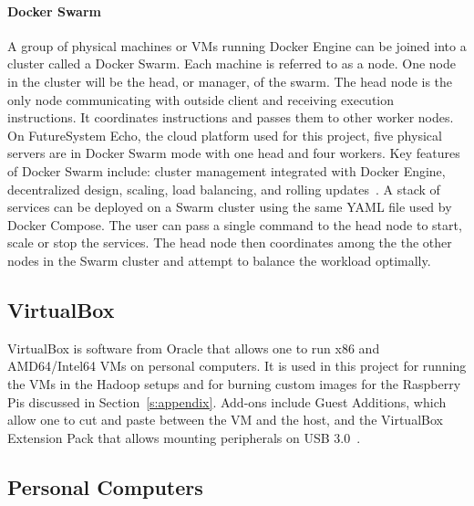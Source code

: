 \paragraph{Docker Swarm} A group of physical machines or VMs running 
Docker Engine can be joined into a cluster called a Docker Swarm. Each
machine is referred to as a node. One node in the cluster will be the
head, or manager, of the swarm. The head node is the only node
communicating with outside client and receiving execution
instructions. It coordinates instructions and passes them to other
worker nodes. On FutureSystem Echo, the cloud platform used for this
project, five physical servers are in Docker Swarm mode with one head
and four workers. Key features of Docker Swarm include: cluster
management integrated with Docker Engine, decentralized design,
scaling, load balancing, and rolling
updates~\cite{hid-sp18-405-docker-swarm-doc}. A stack of services can
be deployed on a Swarm cluster using the same YAML file used by Docker
Compose. The user can pass a single command to the head node to start,
scale or stop the services. The head node then coordinates among the
the other nodes in the Swarm cluster and attempt to balance the
workload optimally.

\subsection{VirtualBox}
VirtualBox is software from Oracle that allows one to run x86 and
AMD64/Intel64 VMs on personal computers. It is used in this project
for running the VMs in the Hadoop setups and for burning custom images
for the Raspberry Pis discussed in Section~\ref{s:appendix}. Add-ons
include Guest Additions, which allow one to cut and paste between the
VM and the host, and the VirtualBox Extension Pack that allows
mounting peripherals on USB 3.0~\cite{hid-sp18-419-virtualbox}.

\subsection{Personal Computers}\label{ss:pcs}
